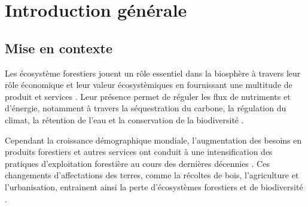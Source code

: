 \chapter*{Introduction générale}         %
\label{chap-introduction}       %


\section*{Mise en contexte}
\label{sec:contexte}

Les écosystème forestiers jouent un rôle essentiel dans la biosphère à travers leur rôle économique et leur valeur écosystèmiques en fournissant une multitude de produit et services \citep{Balvanera2006Quantifyingevidence}. 
Leur présence permet de réguler les flux de nutriments et d'énergie, notamment à travers la séquestration du carbone, la régulation du climat, la rétention de l'eau et la conservation de la biodiversité \citep{Balvanera2006Quantifyingevidence,Diaz2006BiodiversityLoss,Canadell2008Managingforests,Pawson2013Plantationforests}. 

Cependant la croissance démographique mondiale, l'augmentation des besoins en produits forestiers et autres services ont conduit à une intensification des pratiques d'exploitation forestière au cours des dernières décennies \citep{Foley2005GlobalConsequences}. 
Ces changements d'affectations des terres, comme la récoltes de bois, l'agriculture et l'urbanisation, entrainent ainsi la perte d'écosystèmes forestiers et de biodiversité \citep{Bengtsson2000Biodiversitydisturbances,Sala2000Globalbiodiversity,Naeem2012functionsbiological,Bichet2016Maintaininganimal}. 

